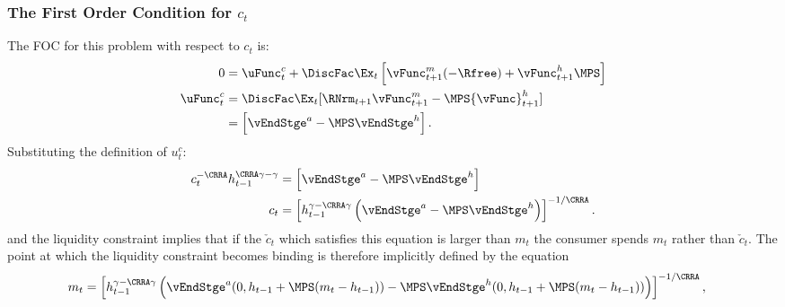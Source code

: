 \documentclass[\econtexRoot/SolvingMicroDSOPs]{subfiles}
\begin{document}
\subsubsection{The First Order Condition for ${c}_{t}$}
The FOC for this problem with respect to ${c}_{t}$ is:
\begin{equation}\begin{gathered}\begin{aligned}
  0  & = \uFunc^{c}_{t} + \DiscFac \Ex_{t} \left[{\vFunc}^{m}_{t+1}(-\Rfree)+{\vFunc}^{h}_{t+1} \MPS\right]  \\
  \uFunc^{c}_{t}  & = \DiscFac \Ex_{t} [\RNrm_{t+1} {\vFunc}_{t+1}^{m}-\MPS {\vFunc}_{t+1}^{h}] \label{eq:ctfoc}
  \\            & = \left[\vEndStge^{{a}}-\MPS \vEndStge^{h} \right].
\end{aligned}\end{gathered}\end{equation}
Substituting the definition of $u_{t}^{c}$:
\begin{equation}\begin{gathered}\begin{aligned}
  {c}_{t}^{-\CRRA}h_{t-1}^{\CRRA\gamma-\gamma}  & = \left[\vEndStge^{{a}}-\MPS \vEndStge^{h} \right]
  \\  {c}_{t}                                     & = \left[h_{t-1}^{\gamma-\CRRA\gamma} \left(\vEndStge^{{a}}-\MPS \vEndStge^{h} \right) \right]^{-1/\CRRA} \label{eq:habitsfoc}.
\end{aligned}\end{gathered}\end{equation}
and the liquidity constraint implies that if the $\check{c}_{t}$ which
satisfies this equation is larger than ${m}_{t}$ the consumer spends
${m}_{t}$ rather than $\check{c}_{t}$.  The point at which the liquidity
constraint becomes binding is therefore implicitly defined by the equation
\begin{equation}\begin{gathered}\begin{aligned}
  {m}_{t}  & = \left[h_{t-1}^{\gamma-\CRRA\gamma} \left(\vEndStge^{{a}}(0,h_{t-1}+\MPS({m}_{t}-h_{t-1}))-\MPS \vEndStge^{h}(0,h_{t-1}+\MPS({m}_{t}-h_{t-1}))\right)  \right]^{-1/\CRRA}, \label{eq:LCbindsHabits}
\end{aligned}\end{gathered}\end{equation}
\end{document}
